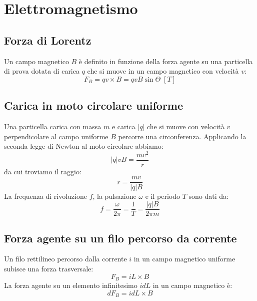 \chapter{Elettromagnetismo}

    \section{Forza di Lorentz} Un campo magnetico $B$ è definito in funzione 
    della forza agente su una particella di prova dotata di carica $q$ che si 
    muove in un campo magnetico con velocità $v$:
        \begin{equation}
            F_B = qv \times B = qvB\sin\Theta \; [T]
        \end{equation}

    \section{Carica in moto circolare uniforme} Una particella carica con massa
    $m$ e carica $|q|$ che si muove con velocità $v$ perpendicolare al campo
    uniforme $B$ percorre una circonferenza. Applicando la seconda legge di 
    Newton al moto circolare abbiamo:
        \begin{equation*}
            |q|vB = \frac{mv^2}{r}
        \end{equation*}
    da cui troviamo il raggio:
        \begin{equation*}
            r = \frac{mv}{|q|B}
        \end{equation*}
    La frequenza di rivoluzione $f$, la pulsazione $\omega$ e il periodo $T$
    sono dati da:
        \begin{equation}
            f = \frac{\omega}{2\pi} = \frac{1}{T} = \frac{|q|B}{2\pi m}
        \end{equation}

    \section{Forza agente su un filo percorso da corrente} Un filo rettilineo
    percorso dalla corrente $i$ in un campo magnetico uniforme subisce una 
    forza trasversale:
        \begin{equation}
            F_B = iL\times B
        \end{equation}
    La forza agente su un elemento infinitesimo $idL$ in un campo magnetico è:
        \begin{equation}
            dF_B = idL\times B
        \end{equation}

